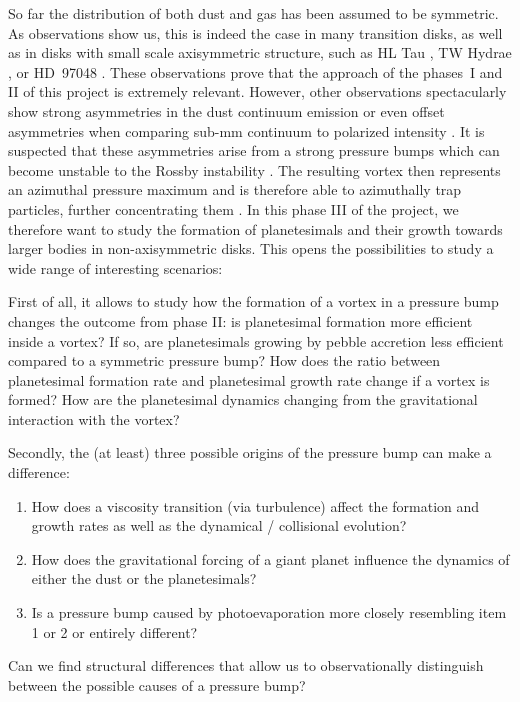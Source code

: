 \documentclass[10pt,fleqn,twoside]{article}
\begin{document}
So far the distribution of both dust and gas has been assumed to be
symmetric. As observations show us, this is indeed the case in many
transition disks, as well as in disks with small scale axisymmetric
structure, such as HL Tau
\citep{2015ApJ...808L...3A,2016ApJ...821L..16C}, TW Hydrae
\citep{2016ApJ...820L..40A,2016ApJ...829L..35T}, or HD~97048
\citep{2016arXiv160902488V}. These observations prove that the
approach of the phases~I and II of this project is extremely relevant.
However, other observations spectacularly show strong asymmetries in
the dust continuum emission \citep[e.g.,][]{2013Natur.493..191C,
2013Sci...340.1199V} or even offset asymmetries when comparing sub-mm
continuum to polarized intensity \cite[see][]{2016ApJ...831L..12K}.
It is suspected that these asymmetries arise from a strong pressure
bumps which can become unstable to the Rossby instability
\citep[e.g.,][]{2001ApJ...551..874L,2009A&A...493.1125L}.
The resulting vortex then represents an azimuthal pressure maximum and
is therefore able to azimuthally trap particles, further concentrating
them \citep[e.g.,][]{1995A&A...295L...1B, 1997Icar..128..213K,
2009A&A...493.1125L, 2013A&A...550L...8B, 2013ApJ...775...17L}. In
this phase III of the project, we therefore want to study the
formation of planetesimals and their growth towards larger bodies in
non-axisymmetric disks. This opens the possibilities to study a wide
range of interesting scenarios:

First of all, it allows to study how the formation of a vortex in a
pressure bump changes the outcome from phase II: is planetesimal
formation more efficient inside a vortex? If so, are planetesimals
growing by pebble accretion less efficient compared to a symmetric
pressure bump? How does the ratio between planetesimal formation rate
and planetesimal growth rate change if a vortex is formed? How are the
planetesimal dynamics changing from the gravitational interaction with
the vortex?

Secondly, the (at least) three possible origins of the pressure bump
can make a difference:
\begin{enumerate}
  \item How does a viscosity transition (via turbulence) affect the
  formation and growth rates as well as the dynamical / collisional
  evolution?
  \item How does the gravitational forcing of a giant planet influence
  the dynamics of either the dust or the planetesimals?
  \item Is a pressure bump caused by photoevaporation more closely
  resembling item 1 or 2 or entirely different? 
\end{enumerate}
Can we find structural differences that allow us to observationally
distinguish between the possible causes of a pressure bump?
\end{document}
